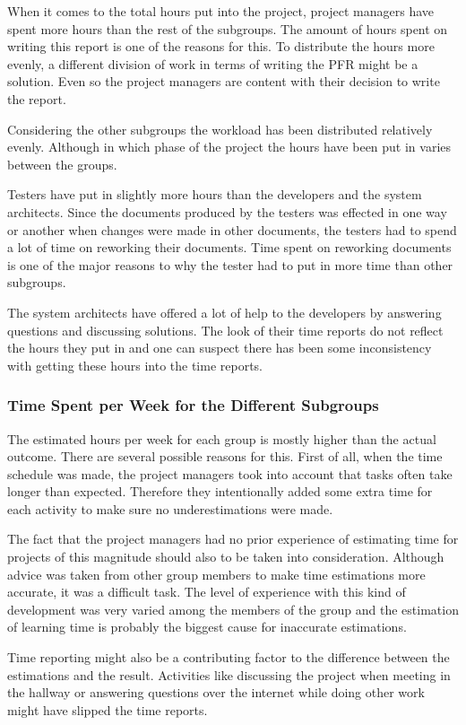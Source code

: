 \documentclass[a4paper]{article}
\begin{document}
When it comes to the total hours put into the project, project managers have spent more hours than the rest of the subgroups. The amount of hours spent on writing this report is one of the reasons for this. To distribute the hours more evenly, a different division of work in terms of writing the PFR might be a solution. Even so the project managers are content with their decision to write the report. 

Considering the other subgroups the workload has been distributed relatively evenly. Although in which phase of the project the hours have been put in varies between the groups. 

Testers have put in slightly more hours than the developers and the system architects. Since the documents produced by the testers was effected in one way or another when changes were made in other documents, the testers had to spend a lot of time on reworking their documents. Time spent on reworking documents is one of the major reasons to why the tester had to put in more time than other subgroups. 

The system architects have offered a lot of help to the developers by answering questions and discussing solutions. The look of their time reports do not reflect the hours they put in and one can suspect there has been some inconsistency with getting these hours into the time reports.


\subsubsection{Time Spent per Week for the Different Subgroups}
The estimated hours per week for each group is mostly higher than the actual outcome. There are several possible reasons for this. First of all, when the time schedule was made, the project managers took into account that tasks often take longer than expected. Therefore they intentionally added some extra time for each activity to make sure no underestimations were made. 

The fact that the project managers had no prior experience of estimating time for projects of this magnitude should also to be taken into consideration. Although advice was taken from other group members to make time estimations more accurate, it was a difficult task. The level of experience with this kind of development was very varied among the members of the group and the estimation of learning time is probably the biggest cause for inaccurate estimations.

Time reporting might also be a contributing factor to the difference between the estimations and the result. Activities like discussing the project when meeting in the hallway or answering questions over the internet while doing other work might have slipped the time reports. 
\end{document}
